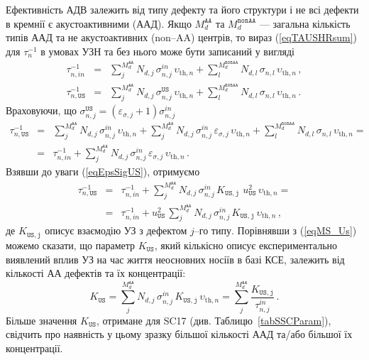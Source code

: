 Ефективність АДВ залежить від типу дефекту та його структури \cite{UST:Medvid}
і не всі дефекти в кремнії є акустоактивними (ААД).
Якщо $M_d^\mathtt{AA}$ та $M_d^\mathtt{nonAA}$ --- загальна кількість типів ААД та не акустоактивних (non--AA) центрів,
то вираз (\ref{eqTAUSHRsum}) для $\tau_{n}^{-1}$ в умовах УЗН та без нього може бути записаний у вигляді
\begin{eqnarray}
\tau_{n,in}^{-1}&=&\sum_j^{M_d^\mathtt{AA}}N_{d,j}\,\sigma_{n,j}^{in}\,\upsilon_{\mathrm{th},n}+
\sum_l^{M_d^\mathtt{nonAA}}N_{d,l}\,\sigma_{n,l}\,\upsilon_{\mathrm{th},n}\,,\\
\tau_{n,\mathtt{US}}^{-1}&=&\sum_j^{M_d^\mathtt{AA}}N_{d,j}\,\sigma_{n,j}^\mathtt{US}\,\upsilon_{\mathrm{th},n}+
\sum_l^{M_d^\mathtt{nonAA}}N_{d,l}\,\sigma_{n,l}\,\upsilon_{\mathrm{th},n}\,.
\end{eqnarray}
Враховуючи, що $\sigma_{n,j}^\mathtt{US}=(\varepsilon_{\sigma,j}+1)\sigma_{n,j}^{in}$
\begin{eqnarray}
\label{eqEpsSigUSA}
\tau_{n,\mathtt{US}}^{-1}&=&\sum_j^{M_d^\mathtt{AA}}N_{d,j}\,\sigma_{n,j}^{in}\,\upsilon_{\mathrm{th},n}+
\sum_j^{M_d^\mathtt{AA}}N_{d,j}\,\sigma_{n,j}^{in}\,\varepsilon_{\sigma,j}\,\upsilon_{\mathrm{th},n}+
\sum_l^{M_d^\mathtt{nonAA}}N_{d,l}\,\sigma_{n,l}\,\upsilon_{\mathrm{th},n}=\nonumber\\
&=&\tau_{n,in}^{-1}+\sum_j^{M_d^\mathtt{AA}}N_{d,j}\,\sigma_{n,j}^{in}\,\varepsilon_{\sigma,j}\,\upsilon_{\mathrm{th},n}\,.
\end{eqnarray}
Взявши до уваги (\ref{eqEpsSigUS}), отримуємо
\begin{eqnarray}
\tau_{n,\mathtt{US}}^{-1}&=&\tau_{n,in}^{-1}+
\sum_j^{M_d^\mathtt{AA}}N_{d,j}\,\sigma_{n,j}^{in}\,K_\mathtt{US,j}\,\,u_{\mathtt{US}}^2\,\upsilon_{\mathrm{th},n}=\nonumber\\
&=&\tau_{n,in}^{-1}+u_{\mathtt{US}}^2\,\sum_j^{M_d^\mathtt{AA}}N_{d,j}\,\sigma_{n,j}^{in}\,K_\mathtt{US,j}\,\upsilon_{\mathrm{th},n}\,,
\end{eqnarray}
де $K_\mathtt{US,j}$ описує взаємодію УЗ з дефектом $j$--го типу.
Порівнявши з (\ref{eqMS_Us}) можемо сказати, що параметр $K_\mathtt{US}$, який кількісно описує експериментально виявлений вплив УЗ на час життя неосновних носіїв в базі КСЕ,
залежить від кількості АА дефектів та їх концентрації:
\begin{equation}
\label{eqKUS}
K_\mathtt{US}=\sum_j^{M_d^\mathtt{AA}}N_{d,j}\,\sigma_{n,j}^{in}\,K_\mathtt{US,j}\,\upsilon_{\mathrm{th},n}=\sum_j^{M_d^\mathtt{AA}}\frac{K_\mathtt{US,j}}{\tau_{n,j}^{in}}\,.
\end{equation}
Більше значення $K_\mathtt{US}$, отримане для SC17 (див. Таблицю~\ref{tabSSCParam}), свідчить про наявність у цьому зразку більшої кількості ААД та/або більшої їх концентрації.

